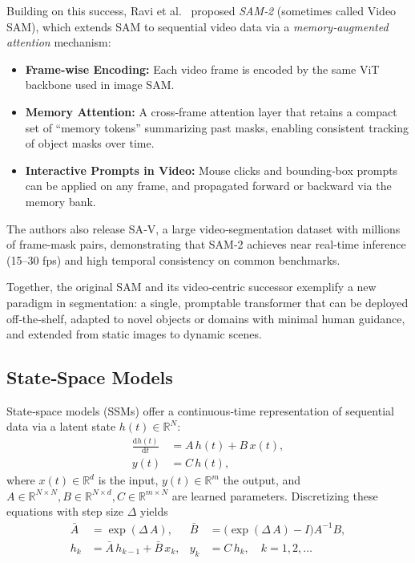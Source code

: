 Building on this success, Ravi et al.\ \cite{ravi_sam_nodate} proposed \emph{SAM‑2} (sometimes called Video SAM), which extends SAM to sequential video data via a \emph{memory‐augmented attention} mechanism:
\begin{itemize}
    \item \textbf{Frame‐wise Encoding:} Each video frame is encoded by the same ViT backbone used in image SAM.
    \item \textbf{Memory Attention:} A cross‐frame attention layer that retains a compact set of “memory tokens” summarizing past masks, enabling consistent tracking of object masks over time.
    \item \textbf{Interactive Prompts in Video:} Mouse clicks and bounding‐box prompts can be applied on any frame, and propagated forward or backward via the memory bank.
\end{itemize}
The authors also release SA‑V, a large video‑segmentation dataset with millions of frame‐mask pairs, demonstrating that SAM‑2 achieves near real‐time inference (15–30 fps) and high temporal consistency on common benchmarks.

Together, the original SAM and its video‐centric successor exemplify a new paradigm in segmentation: a single, promptable transformer that can be deployed off‐the‐shelf, adapted to novel objects or domains with minimal human guidance, and extended from static images to dynamic scenes. 

\subsection{State‐Space Models}
\label{ssec:state_space_models}

State‐space models (SSMs) offer a continuous‐time representation of sequential data via a latent state \(h(t)\in\mathbb{R}^N\):
\begin{align}
    \frac{\mathrm{d}h(t)}{\mathrm{d}t} &= A\,h(t) + B\,x(t),  \label{eq:ssm_continuous1}\\
    y(t) &= C\,h(t),                                    \label{eq:ssm_continuous2}
\end{align}
where \(x(t)\in\mathbb{R}^d\) is the input, \(y(t)\in\mathbb{R}^m\) the output, and \(A\in\mathbb{R}^{N\times N}, B\in\mathbb{R}^{N\times d}, C\in\mathbb{R}^{m\times N}\) are learned parameters.  Discretizing these equations with step size \(\Delta\) yields
\begin{align}
    \bar A &= \exp(\Delta\,A), 
    & 
    \bar B &= \bigl(\exp(\Delta\,A)-I\bigr)A^{-1}B,\\
    h_k &= \bar A\,h_{k-1} + \bar B\,x_k, 
    &
    y_k &= C\,h_k,
    \quad k=1,2,\dots
\end{align}

